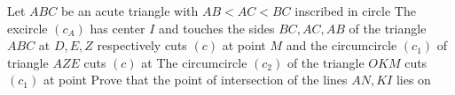 Let $ABC$ be an acute triangle with $\displaystyle{AB<AC<BC}$ inscribed in circle The excircle $\displaystyle{(c_A)}$ has center $\displaystyle{I}$ and touches the sides $\displaystyle{BC,AC,AB}$ of the triangle $ABC$ at $\displaystyle{D,E,Z} $ respectively cuts $\displaystyle{(c)}$ at point $M$ and the circumcircle $\displaystyle{(c_1)}$ of triangle $\displaystyle{AZE}$ cuts $\displaystyle{(c)}$ at The circumcircle $\displaystyle{(c_2)}$ of the triangle $\displaystyle{OKM}$ cuts $\displaystyle{(c_1)} $ at point Prove that the point of intersection of the lines $AN,KI$ lies on 